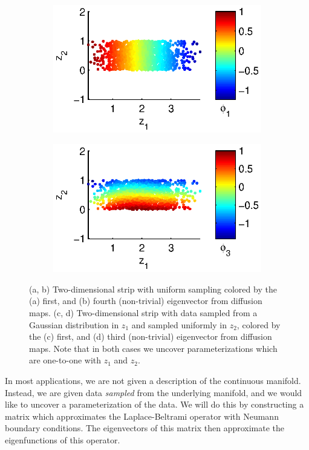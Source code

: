 \documentclass[preprint]{elsarticle}
\begin{document}
\begin{figure}[t]
\begin{subfigure}{0.45\textwidth}
\includegraphics[width=\textwidth]{strip_nonuniform1}
\caption{}
\end{subfigure}
%
\begin{subfigure}{0.45\textwidth}
\includegraphics[width=\textwidth]{strip_nonuniform2}
\caption{}
\end{subfigure}
\caption{(a, b) Two-dimensional strip with uniform sampling colored by the (a) first, and (b) fourth (non-trivial) eigenvector from diffusion maps. (c, d) Two-dimensional strip with data sampled from a Gaussian distribution in $z_1$ and sampled uniformly in $z_2$, colored by the (c) first, and (d) third (non-trivial) eigenvector from diffusion maps. Note that in both cases we uncover parameterizations which are one-to-one with $z_1$ and $z_2$. }
\label{fig:strip_evecs}
\end{figure}

In most applications, we are not given a description of the continuous manifold. 
%
Instead, we are given data {\em sampled} from the underlying manifold, and we would like to uncover a parameterization of the data.
%
We will do this by constructing a matrix which approximates the Laplace-Beltrami operator with Neumann boundary conditions. 
%
The eigenvectors of this matrix then approximate the eigenfunctions of this operator.
\end{document}
